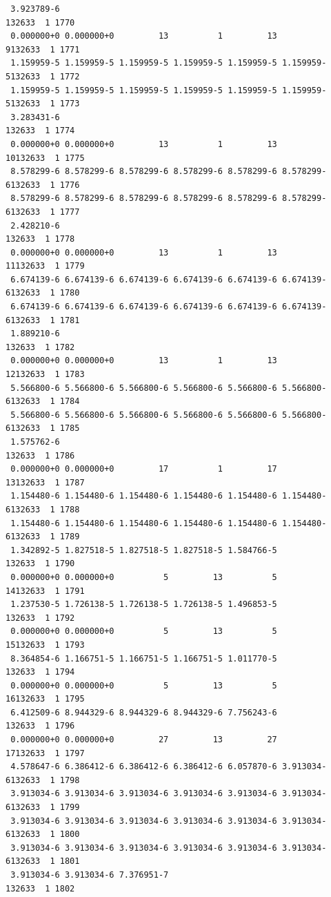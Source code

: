 \begin{verbatim}
 3.923789-6                                                       132633  1 1770
 0.000000+0 0.000000+0         13          1         13          9132633  1 1771
 1.159959-5 1.159959-5 1.159959-5 1.159959-5 1.159959-5 1.159959-5132633  1 1772
 1.159959-5 1.159959-5 1.159959-5 1.159959-5 1.159959-5 1.159959-5132633  1 1773
 3.283431-6                                                       132633  1 1774
 0.000000+0 0.000000+0         13          1         13         10132633  1 1775
 8.578299-6 8.578299-6 8.578299-6 8.578299-6 8.578299-6 8.578299-6132633  1 1776
 8.578299-6 8.578299-6 8.578299-6 8.578299-6 8.578299-6 8.578299-6132633  1 1777
 2.428210-6                                                       132633  1 1778
 0.000000+0 0.000000+0         13          1         13         11132633  1 1779
 6.674139-6 6.674139-6 6.674139-6 6.674139-6 6.674139-6 6.674139-6132633  1 1780
 6.674139-6 6.674139-6 6.674139-6 6.674139-6 6.674139-6 6.674139-6132633  1 1781
 1.889210-6                                                       132633  1 1782
 0.000000+0 0.000000+0         13          1         13         12132633  1 1783
 5.566800-6 5.566800-6 5.566800-6 5.566800-6 5.566800-6 5.566800-6132633  1 1784
 5.566800-6 5.566800-6 5.566800-6 5.566800-6 5.566800-6 5.566800-6132633  1 1785
 1.575762-6                                                       132633  1 1786
 0.000000+0 0.000000+0         17          1         17         13132633  1 1787
 1.154480-6 1.154480-6 1.154480-6 1.154480-6 1.154480-6 1.154480-6132633  1 1788
 1.154480-6 1.154480-6 1.154480-6 1.154480-6 1.154480-6 1.154480-6132633  1 1789
 1.342892-5 1.827518-5 1.827518-5 1.827518-5 1.584766-5           132633  1 1790
 0.000000+0 0.000000+0          5         13          5         14132633  1 1791
 1.237530-5 1.726138-5 1.726138-5 1.726138-5 1.496853-5           132633  1 1792
 0.000000+0 0.000000+0          5         13          5         15132633  1 1793
 8.364854-6 1.166751-5 1.166751-5 1.166751-5 1.011770-5           132633  1 1794
 0.000000+0 0.000000+0          5         13          5         16132633  1 1795
 6.412509-6 8.944329-6 8.944329-6 8.944329-6 7.756243-6           132633  1 1796
 0.000000+0 0.000000+0         27         13         27         17132633  1 1797
 4.578647-6 6.386412-6 6.386412-6 6.386412-6 6.057870-6 3.913034-6132633  1 1798
 3.913034-6 3.913034-6 3.913034-6 3.913034-6 3.913034-6 3.913034-6132633  1 1799
 3.913034-6 3.913034-6 3.913034-6 3.913034-6 3.913034-6 3.913034-6132633  1 1800
 3.913034-6 3.913034-6 3.913034-6 3.913034-6 3.913034-6 3.913034-6132633  1 1801
 3.913034-6 3.913034-6 7.376951-7                                 132633  1 1802

\end{verbatim}
